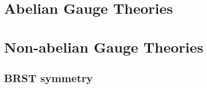 \documentclass[../QFT_main.tex]{subfiles}
\begin{document}
\section{Abelian Gauge Theories}



\section{Non-abelian Gauge Theories}


\subsection{BRST symmetry}
\end{document}
